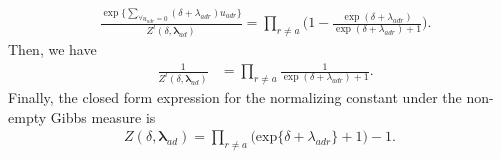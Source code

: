\documentclass[12pt]{article}
\begin{document}
\begin{appendices}
\begin{equation*}
\begin{aligned}
&\frac{\exp\Big\{ \sum\limits_{\forall u_{adr}=0}(\delta+\lambda_{adr})u_{adr} \Big\}}{Z^{l}(\delta,\boldsymbol{\lambda}_{ad})}= \prod_{r \neq a}   \Big(1-\frac{ \exp{(\delta+\lambda_{adr})}}{\exp{(\delta+\lambda_{adr})} + 1}\Big).
\end{aligned}  
\end{equation*}
Then, we have 
\begin{equation*}
\begin{aligned}
& \frac{1}{Z^{l}(\delta,\boldsymbol{\lambda}_{ad})} &= \prod\limits_{r \neq a}\frac{1}{ \exp(\delta+\lambda_{adr})+ 1}.
\end{aligned}  
\end{equation*}
Finally, the closed form expression for the normalizing constant under the non-empty Gibbs measure is  \begin{equation*}
\begin{aligned}Z(\delta,\boldsymbol{\lambda}_{ad}) = \prod_{r \neq a } \big(\mbox{exp}\{\delta+\lambda_{adr}\} + 1\big)-1.
\end{aligned}  
\end{equation*}
 
	\end{appendices}
\end{document}
